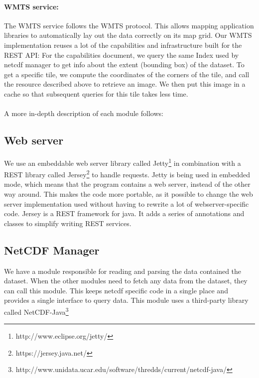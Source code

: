\documentclass[11pt,a4paper,titlepage,oneside]{report}
\begin{document}
\paragraph{WMTS service:}
The \gls{WMTS} service follows the \gls{WMTS} \gls{protocol}\cite{WMTS:spec}.
This allows mapping application libraries to automatically lay out the data correctly on its map grid.  
Our \gls{WMTS} implementation reuses a lot of the capabilities and infrastructure built for the REST \gls{API}:  
For the capabilities document, we query the same Index used by \gls{netcdf} manager to get info about the extent (bounding box) of the dataset.
To get a specific tile, we compute the coordinates of the corners of the tile, and call the resource described above to retrieve an image.
We then put this image in a cache so that subsequent queries for this tile takes less time.

\paragraph{}
A more in-depth description of each module follows:

\subsection{Web server}
We use an embeddable web server library called Jetty\footnote{http://www.eclipse.org/jetty/} in combination with a REST library called Jersey\footnote{https://jersey.java.net/} to handle requests.
Jetty is being used in embedded mode, which means that the program contains a web server, instead of the other way around. This makes the code more portable, as it possible to change the web server implementation used without having to rewrite a lot of webserver-specific code.
Jersey is a REST framework for java. It adds a series of annotations and classes to simplify writing REST services.

\subsection{NetCDF Manager}
We have a module responsible for reading and parsing the data contained the dataset. When the other modules need to fetch any data from the dataset, they can call this module. This keeps \gls{netcdf} specific code in a single place and provides a single interface to query data.
This module uses a third-party library called NetCDF-Java\footnote{http://www.unidata.ucar.edu/software/thredds/current/netcdf-java/}
\end{document}

